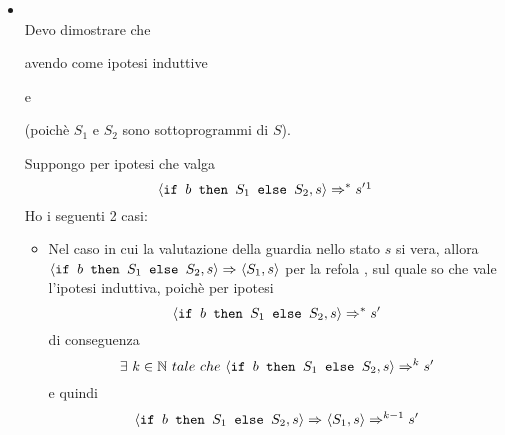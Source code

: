 {\begin{itemize}
	Suppongo per ipotesi che valga
	\[ \confSs{\concat{$S_1$}{$S_2$}}{s}\Rar{*}s' \footnotemark{} \]
	 quindi
	
	\[ \exists{}~k\in\mathbb{N} \quad \textrm{ tale per cui} \quad 
	\confSs{\concat{$S_1$}{$S_2$}}{s}\Rar{k}s' \]
	e quindi, per il \textbf{lemma di decomposizione}, 
	\[ \exists{}~k_0, k_1\in\mathbb{N},s''\in\states~tali~che~
	\confSs{S_1}{s}\Rar{k_0}s''~e~\confSs{S_2}{s''}\Rar{k_1}s'~con~k_o+k_1=k \]
	
	Poichè quindi 
	\[ \confSs{S_1}{s}\Rar{k_0}s'' \qquad \textrm{e} \qquad
	\confSs{S_2}{s''}\Rar{k_1}s' \] 
	per ipotesi induttiva valgono
\[ 	
	\forall{} x \notin lvar\{S_1\}.s(x)=s''(x)  \qquad \textrm{e} \qquad
	\forall{} x \notin lvar\{S_2\}.s''(x)=s'(x) 
	 \]
	Sia $y\notin\lvar{\concat{$S_1$}{$S_2$}}$  allora, per definizione di \texttt{lvar},
	\[  y\notin\lvar{$S_1$} \cup \lvar{$S_2$} \]
	e quindi in particolare 
\[ 	y\notin\lvar{$S_1$} \]
	allora per \hi{} vale
	$s(y)=s''(y)$. 
	Inoltre poichè
	\[ y\notin\lvar{$S_1$} \cup \lvar{$S_2$} \qquad \textrm{ si ha inoltre che } \qquad
	y\notin\lvar{$S_2$} \]
	e quindi per ipotesi induttiva 
	$s''(y)=s'(y)$. \\
	
	Concludendo quindi si ha che $s(y)=s''(y)=s'(y)$ e quindi $s(y)=s'(y)$.
	\postcasespace{}
	
	\item {}
	\casespace{}
	\\
	Devo dimostrare che
	\begin{center}
	\end{center}

	avendo come ipotesi induttive
	\begin{center}
	 e  
	\end{center}
	(poichè $S_1$ e $S_2$ sono sottoprogrammi di
	$S$). 
	
	Suppongo per ipotesi che valga 
	\[ \confSs{\ifABC{b}{S_1}{S_2}}{s}\Rar{*}s'\footnotemark{}  \]
	Ho i seguenti 2	casi:
		\begin{itemize}
		\item{}
		Nel caso in cui la valutazione della guardia nello stato $s$ si vera, 
		allora \\ $\langle{}\mbox{\normalfont{\texttt{if }}} b \textrm{\normalfont{\texttt{ then }}} S_1 \textrm{\normalfont{\texttt{ else }}} S_2, s\rangle{}\Rightarrow^{}\langle{}S_1, s\rangle{}$ 
		per la refola \ifttSOS{}, sul quale so che vale l'ipotesi induttiva,
		poichè per ipotesi 
		\[ \langle{}\mbox{\normalfont{\texttt{if }}} b \textrm{\normalfont{\texttt{ then }}} S_1 \textrm{\normalfont{\texttt{ else }}} S_2, s\rangle{}\Rightarrow^{*}s' \]
		 di conseguenza 
		 \[ \exists~k\in
		\mathbb{N}~tale~che~\langle{}\mbox{\normalfont{\texttt{if }}} b \textrm{\normalfont{\texttt{ then }}} S_1 \textrm{\normalfont{\texttt{ else }}} S_2, s\rangle{}\Rightarrow^{k}s' \] 
		e quindi 
		\[ \langle{}\mbox{\normalfont{\texttt{if }}} b \textrm{\normalfont{\texttt{ then }}} S_1 \textrm{\normalfont{\texttt{ else }}} S_2, s\rangle{}\Rightarrow^{}\langle{}S_1, s\rangle{}\Rightarrow^{k-1}s' \] 
		

\end{itemize}
\end{itemize}}
